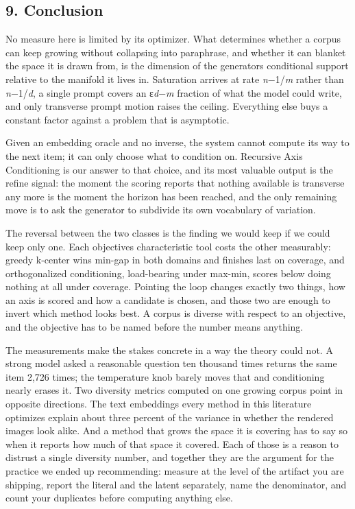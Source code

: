\documentclass[
  10pt,
]{article}
\theoremstyle{plain}
\theoremstyle{definition}
\begin{document}
\subsection{9. Conclusion}\label{9-conclusion}

No measure here is limited by its optimizer. What determines whether a
corpus can keep growing without collapsing into paraphrase, and whether
it can blanket the space it is drawn from, is the dimension of the
generator\textquotesingle s conditional support relative to the manifold
it lives in. Saturation arrives at rate \emph{n}−1/\emph{m} rather than
\emph{n}−1/\emph{d}, a single prompt covers an ε\emph{d}−\emph{m}
fraction of what the model could write, and only transverse prompt
motion raises the ceiling. Everything else buys a constant factor
against a problem that is asymptotic.

Given an embedding oracle and no inverse, the system cannot compute its
way to the next item; it can only choose what to condition on. Recursive
Axis Conditioning is our answer to that choice, and its most valuable
output is the refine signal: the moment the scoring reports that nothing
available is transverse any more is the moment the horizon has been
reached, and the only remaining move is to ask the generator to
subdivide its own vocabulary of variation.

The reversal between the two classes is the finding we would keep if we
could keep only one. Each objective\textquotesingle s characteristic
tool costs the other measurably: greedy k-center wins min-gap in both
domains and finishes last on coverage, and orthogonalized conditioning,
load-bearing under max-min, scores below doing nothing at all under
coverage. Pointing the loop changes exactly two things, how an axis is
scored and how a candidate is chosen, and those two are enough to invert
which method looks best. A corpus is diverse with respect to an
objective, and the objective has to be named before the number means
anything.

The measurements make the stakes concrete in a way the theory could not.
A strong model asked a reasonable question ten thousand times returns
the same item 2,726 times; the temperature knob barely moves that and
conditioning nearly erases it. Two diversity metrics computed on one
growing corpus point in opposite directions. The text embeddings every
method in this literature optimizes explain about three percent of the
variance in whether the rendered images look alike. And a method that
grows the space it is covering has to say so when it reports how much of
that space it covered. Each of those is a reason to distrust a single
diversity number, and together they are the argument for the practice we
ended up recommending: measure at the level of the artifact you are
shipping, report the literal and the latent separately, name the
denominator, and count your duplicates before computing anything else.
\end{document}
